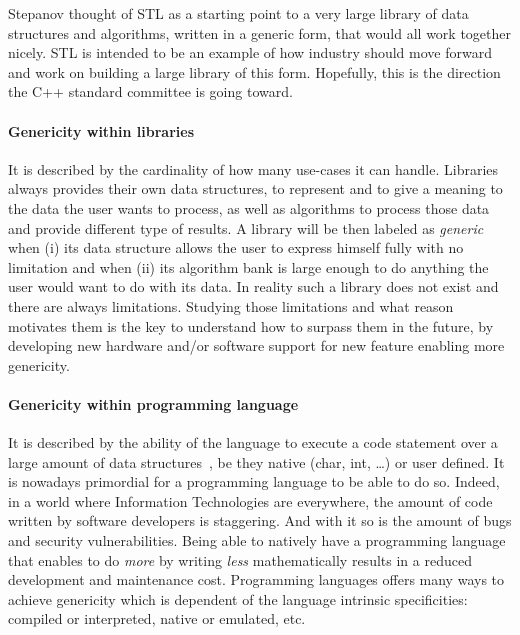 Stepanov thought of STL as a starting point to a very large library of data structures and algorithms, written in a
generic form, that would all work together nicely. STL is intended to be an example of how industry should move forward
and work on building a large library of this form. Hopefully, this is the direction the C++ standard committee is going
toward.

\paragraph{Genericity within libraries} It is described by the cardinality of how many use-cases it can handle.
Libraries always provides their own data structures, to represent and to give a meaning to the data the user wants to
process, as well as algorithms to process those data and provide different type of results. A library will be then
labeled as \emph{generic}~\parencite{musser.1994.algorithm} when (i) its data structure allows the user to express
himself fully with no limitation and when (ii) its algorithm bank is large enough to do anything the user would want to
do with its data. In reality such a library does not exist and there are always limitations. Studying those limitations
and what reason motivates them is the key to understand how to surpass them in the future, by developing new hardware
and/or software support for new feature enabling more genericity.

\paragraph{Genericity within programming language} It is described by the ability of the language to execute a code
statement over a large amount of data structures~\parencite{dehnert.1998.fundamentals}, be they native (char, int,
\ldots) or user defined. It is nowadays primordial for a programming language to be able to do so. Indeed, in a world
where Information Technologies are everywhere, the amount of code written by software developers is staggering. And with
it so is the amount of bugs and security vulnerabilities. Being able to natively have a programming language that
enables to do \emph{more} by writing \emph{less} mathematically results in a reduced development and maintenance cost.
Programming languages offers many ways to achieve genericity which is dependent of the language intrinsic specificities:
compiled or interpreted, native or emulated, etc.

